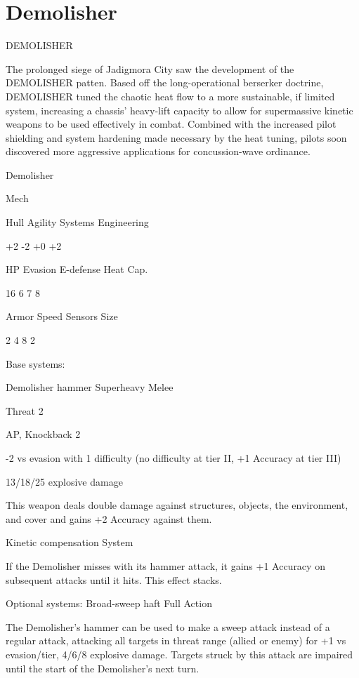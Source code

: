 \section{Demolisher}

                                            DEMOLISHER

The prolonged siege of Jadigmora City saw the development of the DEMOLISHER patten. Based
off the long-operational berserker doctrine, DEMOLISHER tuned the chaotic heat flow to a more
sustainable, if limited system, increasing a chassis’ heavy-lift capacity to allow for supermassive
kinetic weapons to be used effectively in combat. Combined with the increased pilot shielding
and system hardening made necessary by the heat tuning, pilots soon discovered more
aggressive applications for concussion-wave ordinance.


 Demolisher

 Mech

 Hull       Agility      Systems       Engineering

 +2         -2           +0            +2

 HP         Evasion      E-defense     Heat Cap.

 16         6            7             8

 Armor      Speed        Sensors       Size

 2          4            8             2

Base systems:

Demolisher hammer
Superheavy Melee

Threat 2

AP, Knockback 2

-2 vs evasion with 1 difficulty (no difficulty at tier II, +1 Accuracy at tier III)

13/18/25 explosive damage

This weapon deals double damage against structures, objects, the environment, and cover and
gains +2 Accuracy against them.


Kinetic compensation
System

If the Demolisher misses with its hammer attack, it gains +1 Accuracy on subsequent attacks
until it hits. This effect stacks.


Optional systems:
Broad-sweep haft
Full Action

The Demolisher’s hammer can be used to make a sweep attack instead of a regular attack,
attacking all targets in threat range (allied or enemy) for +1 vs evasion/tier, 4/6/8 explosive
damage. Targets struck by this attack are impaired until the start of the Demolisher’s next turn.





